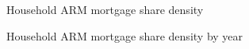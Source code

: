 \documentclass[
  letterpaper,
  DIV=11,
  numbers=noendperiod]{scrartcl}
\begin{document}
\begin{figure}[H]


\caption{\label{fig-Arm_density}Household ARM mortgage share density}

\end{figure}%

\begin{figure}[H]


\caption{\label{fig-Arm_density_year}Household ARM mortgage share
density by year}

\end{figure}%
\end{document}
